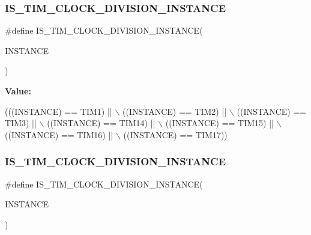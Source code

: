 \subsubsection{\texorpdfstring{I\+S\+\_\+\+T\+I\+M\+\_\+\+C\+L\+O\+C\+K\+\_\+\+D\+I\+V\+I\+S\+I\+O\+N\+\_\+\+I\+N\+S\+T\+A\+N\+CE}{IS\_TIM\_CLOCK\_DIVISION\_INSTANCE}\hspace{0.1cm}{\footnotesize\ttfamily [8/16]}}
{\footnotesize\ttfamily \#define I\+S\+\_\+\+T\+I\+M\+\_\+\+C\+L\+O\+C\+K\+\_\+\+D\+I\+V\+I\+S\+I\+O\+N\+\_\+\+I\+N\+S\+T\+A\+N\+CE(\begin{DoxyParamCaption}\item[{}]{I\+N\+S\+T\+A\+N\+CE }\end{DoxyParamCaption})}

{\bfseries Value\+:}
\begin{DoxyCode}
(((INSTANCE) == TIM1)    || \(\backslash\)
   ((INSTANCE) == TIM2)    || \(\backslash\)
   ((INSTANCE) == TIM3)    || \(\backslash\)
   ((INSTANCE) == TIM14)   || \(\backslash\)
   ((INSTANCE) == TIM15)   || \(\backslash\)
   ((INSTANCE) == TIM16)   || \(\backslash\)
   ((INSTANCE) == TIM17))
\end{DoxyCode}
\mbox{\label{group___exported__macro_gac54b9f42e8ab07c41abe7d96d13d698a}} 
\subsubsection{\texorpdfstring{I\+S\+\_\+\+T\+I\+M\+\_\+\+C\+L\+O\+C\+K\+\_\+\+D\+I\+V\+I\+S\+I\+O\+N\+\_\+\+I\+N\+S\+T\+A\+N\+CE}{IS\_TIM\_CLOCK\_DIVISION\_INSTANCE}\hspace{0.1cm}{\footnotesize\ttfamily [9/16]}}
{\footnotesize\ttfamily \#define I\+S\+\_\+\+T\+I\+M\+\_\+\+C\+L\+O\+C\+K\+\_\+\+D\+I\+V\+I\+S\+I\+O\+N\+\_\+\+I\+N\+S\+T\+A\+N\+CE(\begin{DoxyParamCaption}\item[{}]{I\+N\+S\+T\+A\+N\+CE }\end{DoxyParamCaption})}


